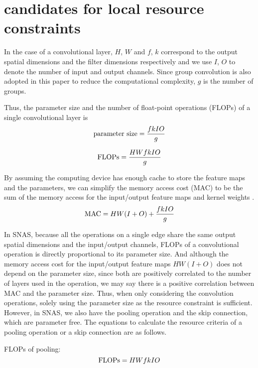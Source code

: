 \documentclass{article} \usepackage{iclr2019_conference,times}
\begin{document}
\section{candidates for local resource constraints}

In the case of a convolutional layer, $H$, $W$ and $f$, $k$ correspond to the output spatial dimensions and the filter dimensions respectively and we use $I$, $O$ to denote the number of input and output channels. Since group convolution is also adopted in this paper to reduce the computational complexity, $g$ is the number of groups.

Thus, the parameter size and the number of float-point operations (FLOPs) of a single convolutional layer is
\begin{equation}
	{\rm parameter\ size} = \frac{fkIO}{g}
\end{equation}

\begin{equation}
	{\rm FLOPs} = \frac{HWfkIO}{g}
\end{equation}

By assuming the computing device has enough cache to store the feature maps and the parameters, we can simplify the memory access cost (MAC) to be the sum of the memory access for the input/output feature maps and kernel weights \citep{ma2018shufflenet}.
\begin{equation}
	{\rm MAC} = HW(I + O) + \frac{fkIO}{g}
\end{equation}

In SNAS, because all the operations on a single edge share the same output spatial dimensions and the input/output channels, FLOPs of a convolutional operation is directly proportional to its parameter size. And although the memory access cost for the input/output feature maps $HW(I + O)$ does not depend on the parameter size, since both are positively correlated to the number of layers used in the operation, we may say there is a positive correlation between MAC and the parameter size. Thus, when only considering the convolution operations, solely using the parameter size as the resource constraint is sufficient. However, in SNAS, we also have the pooling operation and the skip connection, which are parameter free. The equations to calculate the resource criteria of a pooling operation or a skip connection are as follows.

FLOPs of pooling:
\begin{equation}
	{\rm FLOPs} = HWfkIO
\end{equation}
\end{document}
